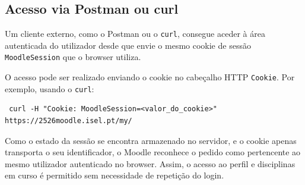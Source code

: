 \subsection*{Acesso via Postman ou curl}

Um cliente externo, como o Postman ou o \texttt{curl}, consegue aceder à área autenticada do utilizador desde que envie o mesmo cookie de sessão \texttt{MoodleSession} que o browser utiliza.

O acesso pode ser realizado enviando o cookie no cabeçalho HTTP \texttt{Cookie}. Por exemplo, usando o \texttt{curl}:

\begin{verbatim} curl -H "Cookie: MoodleSession=<valor_do_cookie>"
https://2526moodle.isel.pt/my/ \end{verbatim}

Como o estado da sessão se encontra armazenado no servidor, e o cookie apenas transporta o seu identificador, o Moodle reconhece o pedido como pertencente ao mesmo utilizador autenticado no browser. Assim, o acesso ao perfil e disciplinas em curso é permitido sem necessidade de repetição do login.